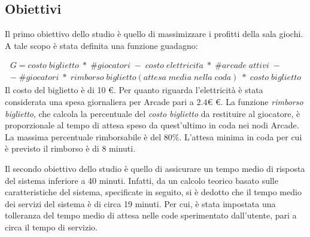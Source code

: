 \documentclass{article}
\begin{document}
\subsection{Obiettivi}
\label{Goal}
\par Il primo obiettivo dello studio è quello di massimizzare i profitti della sala giochi. A tale scopo è stata definita una funzione guadagno:

\begin{equation}
\begin{split}
   G = costo\; biglietto \;*\; \#giocatori\; -\; costo\; elettricit\grave a \;*\; \#arcade \;attivi\; - \\-\; \#giocatori \;*\; rimborso \;biglietto(attesa\;media\;nella\;coda)\;*\;costo\;biglietto
\end{split}
\end{equation}
Il costo del biglietto è di 10 \euro . Per quanto riguarda l'elettricità è stata considerata una spesa giornaliera per Arcade pari a $2.4 €$ \euro. La funzione \textit{rimborso biglietto}, che calcola la percentuale del \textit{costo biglietto} da restituire al giocatore, è proporzionale al tempo di attesa speso da quest'ultimo in coda nei nodi Arcade. La massima percentuale rimborsabile è del $80\%$. L'attesa minima in coda per cui è previsto il rimborso è di 8 minuti. 
\\
\par Il secondo obiettivo dello studio è quello di assicurare un tempo medio di risposta del sistema inferiore a 40 minuti. Infatti, da un calcolo teorico basato sulle caratteristiche del sistema, specificate in seguito, si è dedotto che il tempo medio dei servizi del sistema è di circa 19 minuti. Per cui, è stata impostata una tolleranza del tempo medio di attesa nelle code sperimentato dall'utente, pari a circa il tempo di servizio.



	
\end{document}
